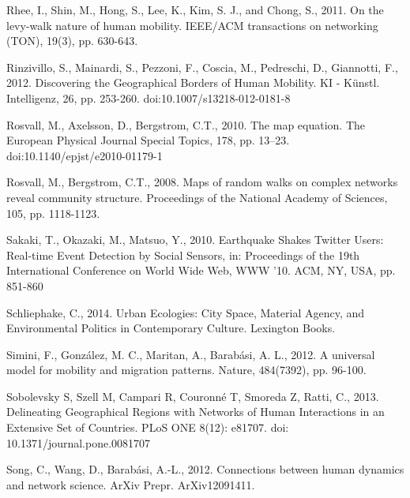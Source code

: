 \documentclass[]{tGIS2e}
\begin{document}
\begin{thebibliography}{9}
Rhee, I., Shin, M., Hong, S., Lee, K., Kim, S. J., and Chong, S., 2011. On the levy-walk nature of human mobility. IEEE/ACM transactions on networking (TON), 19(3), pp. 630-643.

Rinzivillo, S., Mainardi, S., Pezzoni, F., Coscia, M., Pedreschi, D., Giannotti, F., 2012. Discovering the Geographical Borders of Human Mobility. KI - Künstl. Intelligenz, 26, pp. 253-260. doi:10.1007/s13218-012-0181-8

Rosvall, M., Axelsson, D., Bergstrom, C.T., 2010. The map equation. The European Physical Journal Special Topics, 178, pp. 13–23. doi:10.1140/epjst/e2010-01179-1

Rosvall, M., Bergstrom, C.T., 2008. Maps of random walks on complex networks reveal community structure. Proceedings of the National Academy of Sciences, 105, pp. 1118-1123.

Sakaki, T., Okazaki, M., Matsuo, Y., 2010. Earthquake Shakes Twitter Users: Real-time Event Detection by Social Sensors, in: Proceedings of the 19th International Conference on World Wide Web, WWW ’10. ACM, NY, USA, pp. 851-860

Schliephake, C., 2014. Urban Ecologies: City Space, Material Agency, and Environmental Politics in Contemporary Culture. Lexington Books.

Simini, F., González, M. C., Maritan, A., Barabási, A. L., 2012. A universal model for mobility and migration patterns. Nature, 484(7392), pp. 96-100.

Sobolevsky S, Szell M, Campari R, Couronné T, Smoreda Z, Ratti, C., 2013. Delineating Geographical Regions with Networks of Human Interactions in an Extensive Set of Countries. PLoS ONE 8(12): e81707. doi: 10.1371/journal.pone.0081707

Song, C., Wang, D., Barabási, A.-L., 2012. Connections between human dynamics and network science. ArXiv Prepr. ArXiv12091411.



\end{thebibliography}
\end{document}
